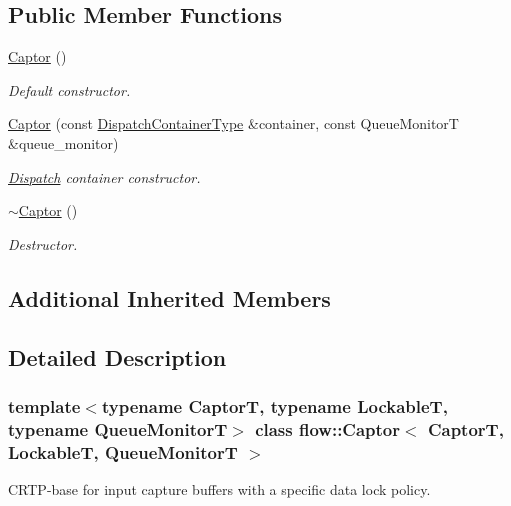 \subsection*{Public Member Functions}
\begin{DoxyCompactItemize}
\item 
\mbox{\label{classflow_1_1_captor_a88157a75b4bd2db2673bc5c0287669fe}} 
\hyperlink{classflow_1_1_captor_a88157a75b4bd2db2673bc5c0287669fe}{Captor} ()
\begin{DoxyCompactList}\small\item\em Default constructor. \end{DoxyCompactList}\item 
\hyperlink{classflow_1_1_captor_ab5d0d53e66fae964b39c80eb28092a29}{Captor} (const \hyperlink{classflow_1_1_captor_a9dce19a6644e31358099f2aeb1873b6a}{Dispatch\+Container\+Type} \&container, const Queue\+MonitorT \&queue\+\_\+monitor)
\begin{DoxyCompactList}\small\item\em \hyperlink{classflow_1_1_dispatch}{Dispatch} container constructor. \end{DoxyCompactList}\item 
\hyperlink{classflow_1_1_captor_a6d3e5ade0abc054ef81dedfa05a8b55b}{$\sim$\+Captor} ()
\begin{DoxyCompactList}\small\item\em Destructor. \end{DoxyCompactList}\end{DoxyCompactItemize}
\subsection*{Additional Inherited Members}


\subsection{Detailed Description}
\subsubsection*{template$<$typename CaptorT, typename LockableT, typename Queue\+MonitorT$>$\newline
class flow\+::\+Captor$<$ Captor\+T, Lockable\+T, Queue\+Monitor\+T $>$}

C\+R\+T\+P-\/base for input capture buffers with a specific data lock policy. 


